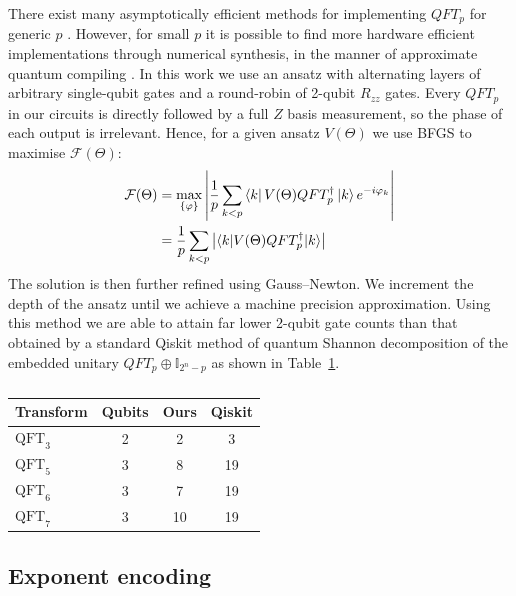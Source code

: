 There exist many asymptotically efficient methods for implementing $QFT_p$ for generic $p$ \cite{kitaev1995quantum,hales2000improved, hales2002quantum, mosca2004exact, kuo2026quantum}. However, for small $p$ it is possible to find more hardware efficient implementations through numerical
synthesis, in the manner of approximate quantum compiling \cite{khatri2019quantum, madden2022best, rakyta2022approaching, nemkov2023efficient}. In this work we use an ansatz with alternating layers of arbitrary single-qubit gates and a round-robin of 2-qubit $R_{zz}$ gates. Every $QFT_p$ in our circuits is directly followed by a full $Z$ basis measurement, so the phase of each output is irrelevant. Hence, for a given ansatz $V(\Theta)$ we use BFGS to maximise $\mathcal{F}(\Theta)$:
\begin{align}
    \mathcal{F}(\Theta)
 &= \max_{\{\varphi\}}\left| \frac{1}{p}\sum_{k<p}
    \bra{k}V(\Theta) QFT_p^{\dagger}\ket{k}e^{-i\varphi_k }\right|\\
 &= \frac{1}{p}\sum_{k<p}\left|\langle k|V(\Theta) QFT_p^{\dagger}|k\rangle\right| 
\end{align}
The solution is then further refined using Gauss–Newton. We increment the depth of the ansatz until we achieve a machine precision approximation. Using this method we are able to attain far lower 2-qubit gate counts than that obtained by a standard Qiskit method of quantum Shannon decomposition of the embedded unitary $QFT_p \oplus \mathbb{I}_{2^{n}-p}$ as shown in Table~\ref{tab:fourier}.

\begin{table}[htbp]
\centering
\setlength{\tabcolsep}{8pt}
\renewcommand{\arraystretch}{1.3}
\begin{tabular}{@{}lccc@{}}
\toprule
Transform & Qubits & Ours & Qiskit \\
\midrule
$\mathrm{QFT}_3$ & 2 & 2  & 3  \\
$\mathrm{QFT}_5$ & 3 & 8  & 19 \\
$\mathrm{QFT}_6$ & 3 & 7  & 19 \\
$\mathrm{QFT}_7$ & 3 & 10 & 19 \\
\bottomrule
\end{tabular}
\caption{}
\label{tab:fourier}
\end{table}

\subsection{Exponent encoding}

